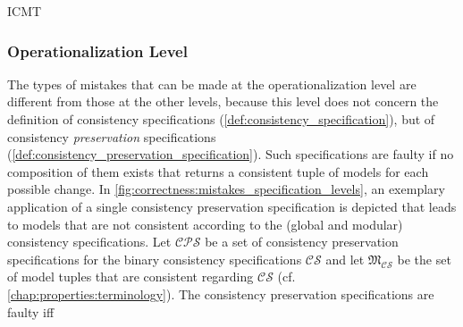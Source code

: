 \begin{copiedFrom}{ICMT}
\subsubsection{Operationalization Level}
The types of mistakes that can be made at the operationalization level are different from those at the other levels, because this level does not concern the definition of consistency specifications (\autoref{def:consistency_specification}), but of consistency \emph{preservation} specifications (\autoref{def:consistency_preservation_specification}).
Such specifications are faulty if no composition of them exists that returns a consistent tuple of models for each possible change. %
In \autoref{fig:correctness:mistakes_specification_levels}, an exemplary application of a single consistency preservation specification is depicted that leads to models that are not consistent according to the (global and modular) consistency specifications.
Let $\mathcal{CPS}$ be a set of consistency preservation specifications  %
for the binary consistency specifications $\mathcal{CS}$ %
and
let $\mathfrak{M}_{\mathcal{CS}}$ be the set of model tuples that are consistent regarding $\mathcal{CS}$ (cf. \autoref{chap:properties:terminology}). 
The consistency preservation specifications are faulty iff

\end{copiedFrom}
